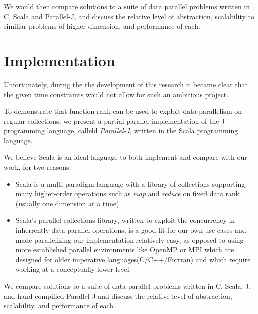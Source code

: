 We would then compare solutions to a suite of data parallel problems written in C, Scala and Parallel-J,
and discuss the relative level of abstraction, scalability to similiar problems of higher dimension, and performance of each.

\section{Implementation}
\label{imp}

Unfortunately, during the the development of this research it became clear that the given time constraints would not allow for such an ambitious project.

To demonstrate that function rank can be used to exploit data parallelism on regular collections, we present a partial parallel implementation of the J programming language, calleld \textit{Parallel-J}, written in the Scala programming language.\begin{comment}TODO cite?\end{comment}
We believe Scala is an ideal language to both implement and compare with our work, for two reasons.
\begin{itemize}
    \item Scala is a multi-paradigm language with a library of collections supporting many higher-order operations such as \textit{map} and \textit{reduce} on fixed data rank (usually one dimension at a time). %
    \item Scala's parallel collections library\cite{pc}, written to exploit the concurrency in inherrently data parallel operations, is a good fit for our own use cases and made parallelizing our implementation relatively easy, as opposed to using more established parallel environments like OpenMP or MPI which are designed for older imperative languages(C/C++/Fortran) and which require working at a conceptually lower level.
\end{itemize}
We compare solutions to a suite of data parallel problems written in C, Scala, J, and hand-compilied Parallel-J %
and discuss the relative level of abstraction, scalability, and performance of each.

\nocite{rankanduni}
\nocite{dph}

\begin{comment}
Data rank is simply the rank of a collection, and scalar values are considered to be collections of rank 0.
Thus, the rank of some regular collection is a non-negative integer.%
Function rank is a rank 1 collection of each of the associated data rank values of a function's expected arguments, usually with some value to represent when the function can take data of any rank for a specific argument.
\end{comment}

